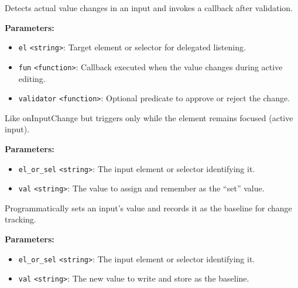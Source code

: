 \documentclass[12pt,a4paper]{article}
\begin{document}
\noindent Detects actual value changes in an input and invokes a callback after validation.

\vspace{5mm}
\noindent {}


\noindent \textbf{Parameters:}
\begin{itemize}
  \item \texttt{el} \texttt{<string>}: Target element or selector for delegated listening.
  \item \texttt{fun} \texttt{<function>}: Callback executed when the value changes during active editing.
  \item \texttt{validator} \texttt{<function>}: Optional predicate to approve or reject the change.
\end{itemize}

\noindent Like \textasciigrave{}onInputChange\textasciigrave{} but triggers only while the element remains focused (active input).

\vspace{5mm}
\noindent {}


\noindent \textbf{Parameters:}
\begin{itemize}
  \item \texttt{el\_or\_sel} \texttt{<string>}: The input element or selector identifying it.
  \item \texttt{val} \texttt{<string>}: The value to assign and remember as the “set” value.
\end{itemize}

\noindent Programmatically sets an input’s value and records it as the baseline for change tracking.

\vspace{5mm}
\noindent {}


\noindent \textbf{Parameters:}
\begin{itemize}
  \item \texttt{el\_or\_sel} \texttt{<string>}: The input element or selector identifying it.
  \item \texttt{val} \texttt{<string>}: The new value to write and store as the baseline.
\end{itemize}
\end{document}
